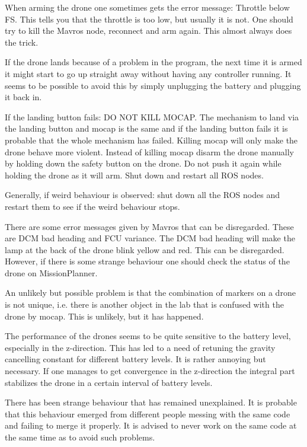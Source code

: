 \documentclass[titlepage,11pt,a4paper]{article}
\begin{document}
When arming the drone one sometimes gets the error message: Throttle below FS. This tells you that the throttle is too low, but usually it is not. One should try to kill the Mavros node, reconnect and arm again. This almost always does the trick.

If the drone lands because of a problem in the program, the next time it is armed it might start to go up straight away without having any controller running. It seems to be possible to avoid this by simply unplugging the battery and plugging it back in. 

If the landing button fails: DO NOT KILL MOCAP. The mechanism to land via the landing button and mocap is the same and if the landing button fails it is probable that the whole mechanism has failed. Killing mocap will only make the drone behave more violent. Instead of killing mocap disarm the drone manually by holding down the safety button on the drone. Do not push it again while holding the drone as it will arm. Shut down and restart all ROS nodes.

Generally, if weird behaviour is observed: shut down all the ROS nodes and restart them to see if the weird behaviour stops.

There are some error messages given by Mavros that can be disregarded. These are DCM bad heading and FCU variance. The DCM bad heading will make the lamp at the back of the drone blink yellow and red. This can be disregarded. However, if there is some strange behaviour one should check the status of the drone on MissionPlanner.

An unlikely but possible problem is that the combination of markers on a drone is not unique, i.e. there is another object in the lab that is confused with the drone by mocap. This is unlikely, but it has happened.

The performance of the drones seems to be quite sensitive to the battery level, especially in the z-direction. This has led to a need of retuning the gravity cancelling constant for different battery levels. It is rather annoying but necessary. If one manages to get convergence in the z-direction the integral part stabilizes the drone in a certain interval of battery levels.

There has been strange behaviour that has remained unexplained. It is probable that this behaviour emerged from different people messing with the same code and failing to merge it properly. It is advised to never work on the same code at the same time as to avoid such problems.
\end{document}

